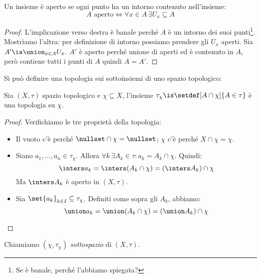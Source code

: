 
\begin{lemma}\label{th:apertointorni}
	Un insieme è aperto se ogni punto ha un intorno contenuto nell'insieme:
	\[A\text{ aperto}\iff
	\forall x\in A\,\exists U_x\subseteq A\]
\end{lemma}

\begin{proof}
	L'implicazione verso destra è banale perché $A$ è un intorno dei suoi punti\footnote{Se è banale, perché l'abbiamo spiegata?}.
	Mostriamo l'altra: per definizione di intorno possiamo prendere gli $U_x$ aperti. Sia $A'\is\union_{x\in A}U_x$. $A'$ è aperto perché unione di aperti ed è contenuto in $A$, però contiene tutti i punti di $A$ quindi $A=A'$.
\end{proof}


Si può definire una topologia sui sottoinsiemi di uno spazio topologico:

\begin{prop}
	Sia $(X,\tau)$ spazio topologico e $\chi\subseteq X$, l'insieme
	$\tau_\chi\is\setdef[A\cap\chi]{A\in\tau}$
	è una topologia su $\chi$.
\end{prop}

\begin{proof}
	Verifichiamo le tre proprietà della topologia:
	\begin{itemize}
		\item Il vuoto c'è perché $\nullset\cap\chi=\nullset$;
		$\chi$ c'è perché $X\cap\chi=\chi$.
		\item Siano $a_1,\ldots,a_n\in\tau_\chi$.
		Allora $\forall k\,\exists A_k\in\tau:a_k=A_k\cap\chi$.
		Quindi:
		\[\inters a_k=\inters(A_k\cap\chi)=\left(\inters A_k\right)\cap\chi\]
		Ma $\inters A_k$ è aperto in $(X,\tau)$.
		\item Sia $\set{a_k}_{k\in I}\subseteq\tau_\chi$.
		Definiti come sopra gli $A_k$, abbiamo:
		\[\union a_k=\union(A_k\cap\chi)=\left(\union A_k\right)\cap\chi \qedhere\]
	\end{itemize}
\end{proof}

\begin{defn}[Sottospazio]
	Chiamiamo $(\chi,\tau_\chi)$ \emph{sottospazio} di $(X,\tau)$.
\end{defn}

